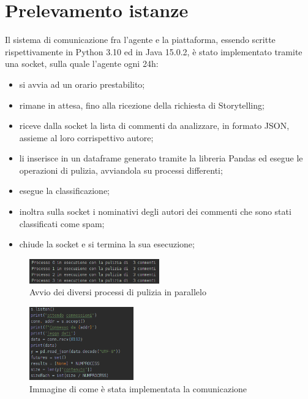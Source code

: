 \documentclass{report}
\begin{document}
    \section{Prelevamento istanze}
    Il sistema di comunicazione fra l'agente e la piattaforma, essendo scritte rispettivamente in Python 3.10 ed in Java 15.0.2, è stato 
    implementato tramite una socket, sulla quale l'agente ogni 24h:
    \begin{itemize}
        \item si avvia ad un orario prestabilito;
        \item rimane in attesa, fino alla ricezione della richiesta di Storytelling;
        \item riceve dalla socket la lista di commenti da analizzare, in formato JSON, assieme al loro corrispettivo autore;
        \item li inserisce in un dataframe generato tramite la libreria Pandas ed esegue le operazioni di pulizia, avviandola su processi differenti;
        \item esegue la classificazione;
        \item inoltra sulla socket i nominativi degli autori dei commenti che sono stati classificati come spam;
        \item chiude la socket e si termina la sua esecuzione;
    \end{itemize}

    \begin{figure}[h!]
        \centering
        \includegraphics[width =0.5\textwidth]{immagini/puliziaCommenti.png}
        \caption{Avvio dei diversi processi di pulizia in parallelo}

    \end{figure}

    \begin{figure}[h!]
        \centering
        \includegraphics[width =0.4\textwidth]{immagini/socket.png}
        \caption{Immagine di come è stata implementata la comunicazione}

    \end{figure}
\end{document}
